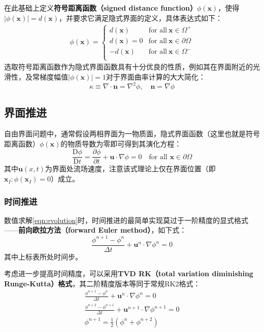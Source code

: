 \documentclass[10pt]{article}
\begin{document}
在此基础上定义\textbf{符号距离函数（signed distance function）}$\phi(\bm{x})$，使得$|\phi(\bm{x})|=d(\bm{x})$，并要求它满足隐式界面的定义，具体表达式如下：
\begin{eqnarray}
    \phi(\bm{x})=\left\{\begin{array}{rl}
        d(\bm{x})   & \text{for all}\ \bm{x}\in\Omega^+       \\
        d(\bm{x})=0 & \text{for all}\ \bm{x}\in\partial\Omega \\
        -d(\bm{x})  & \text{for all}\ \bm{x}\in\Omega^-       \\
    \end{array}\right.
    \label{eqn:sdf}
\end{eqnarray}
选取符号距离函数作为隐式界面函数具有十分优良的性质，例如其在界面附近的光滑性，及常梯度幅值$\left|\phi(\bm{x})\right|=1$对于界面曲率计算的大大简化：
\begin{equation}
    \kappa\equiv\nabla\cdot\bm{n}=\nabla^2\phi,\quad \bm{n}=\nabla\phi
\end{equation}

\subsection{界面推进}
自由界面问题中，通常假设两相界面为一物质面，隐式界面函数（这里也就是符号距离函数）$\phi(\bm{x})$的物质导数为零即可得到其演化方程：
\begin{equation}
    \frac{\mathrm{D}\phi}{\mathrm{D}t}=\frac{\partial\phi}{\partial t}+\bm{u}\cdot\nabla\phi=0\quad\text{for all }\bm{x}\in\partial\Omega
    \label{eqn:evolution}
\end{equation}
其中$\bm{u}(x,t)$为界面处流场速度，注意该式理论上仅在界面位置（即$\bm{x}_I:\phi(\bm{x}_I)=0$）成立。

\subsubsection{时间推进}
数值求解\autoref{eqn:evolution}时，时间推进的最简单实现莫过于一阶精度的显式格式——\textbf{前向欧拉方法（forward Euler method）}，如下式：
\begin{equation}
    \frac{\phi^{n+1}-\phi^n}{\Delta t}+\bm{u}^n\cdot\nabla\phi^n=0
\end{equation}
其中上标表所处时间步。

考虑进一步提高时间精度，可以采用\textbf{TVD RK（total variation diminishing Runge-Kutta）格式}，其二阶精度版本等同于常规RK2格式：
\begin{eqnarray}
    \frac{\phi^{n+1}-\phi^n}{\Delta t}+\bm{u}^n\cdot\nabla\phi^n=0 \\
    \frac{\phi^{n+2}-\phi^{n+1}}{\Delta t}+\bm{u}^{n+1}\cdot\nabla\phi^{n+1}=0 \\
    \phi^{n+1}=\frac{1}{2}\left(\phi^n+\phi^{n+2}\right)
\end{eqnarray}
\end{document}
